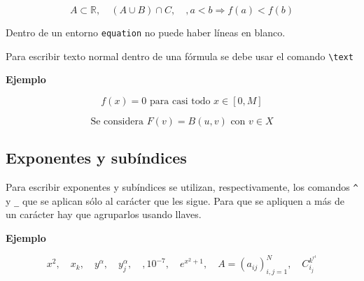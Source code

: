 \documentclass[10pt,a4paper]{report}
\begin{document}
\begin{equation*}
A \subset \mathds{R}, \quad (A \cup B)\cap C,\quad, a<b \Longrightarrow f(a)<f(b)
\end{equation*}
\Heart

\bigskip





Dentro de un entorno \texttt{equation} no puede haber líneas en blanco. 

Para escribir texto normal dentro de una fórmula se debe usar el comando \verb+\text+




\bigskip
\textbf{Ejemplo}

\begin{equation*}
f(x)=0 \text{ para casi todo } x \in [0,M]
\end{equation*}

\begin{equation*}
\text{Se considera }F(v)=B(u,v)\text{ con }v \in X
\end{equation*}
\bigskip






\subsection{Exponentes y subíndices}



Para escribir exponentes y subíndices se utilizan, respectivamente, 
los comandos \verb+^+ y \verb+_+
que se aplican sólo al carácter que les sigue. Para que se apliquen a más de un carácter hay que agruparlos usando llaves.



\bigskip
\textbf{Ejemplo}

\begin{equation*}
x^2, \quad x_k, \quad y^\alpha, \quad y_j^\alpha, \quad, 10^{-7}, \quad e^{x^2+1}, \quad A=(a_{ij})^N_{i,j=1}, \quad C_{i_j}^{k^{r^t}}
\end{equation*}
\bigskip
\end{document}

